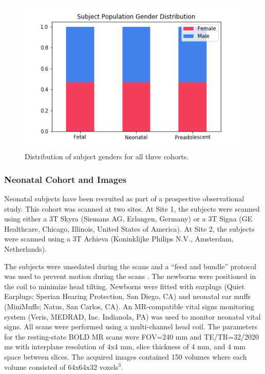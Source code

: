\begin{figure}
\centering
\includegraphics[width=.75\textwidth]{5/demo_clinical_subj_gender.png}
\caption{Distribution of subject genders for all three cohorts.}
\label{ch5:clinical:gender}
\end{figure}

\subsubsection{Neonatal Cohort and Images}

Neonatal subjects have been recruited as part of a prospective observational study. This cohort was scanned at two sites. At Site 1, the subjects were scanned using either a 3T Skyra (Siemans AG, Erlangen, Germany) or a 3T Signa (GE Healthcare, Chicago, Illinois, United States of America). At Site 2, the subjects were scanned using a 3T Achieva (Koninklijke Philips N.V., Amsterdam, Netherlands).

The subjects were unsedated during the scans and a ``feed and bundle'' protocol was used to prevent motion during the scans \cite{Windram2011}. The newborns were positioned in the coil to minimize head tilting. Newborns were fitted with earplugs (Quiet Earplugs; Sperian Hearing Protection, San Diego, CA) and neonatal ear muffs (MiniMuffs; Natus, San Carlos, CA). An MR-compatible vital signs monitoring system (Veris, MEDRAD, Inc. Indianola, PA) was used to monitor neonatal vital signs. All scans were performed using a multi-channel head coil. The parameters for the resting-state BOLD MR scans were FOV=240 mm and TE/TR=32/2020 ms with interplane resolution of 4x4 mm, slice thickness of 4 mm, and 4 mm space between slices. The acquired images contained 150 volumes where each volume consisted of 64x64x32 voxels$^3$.

